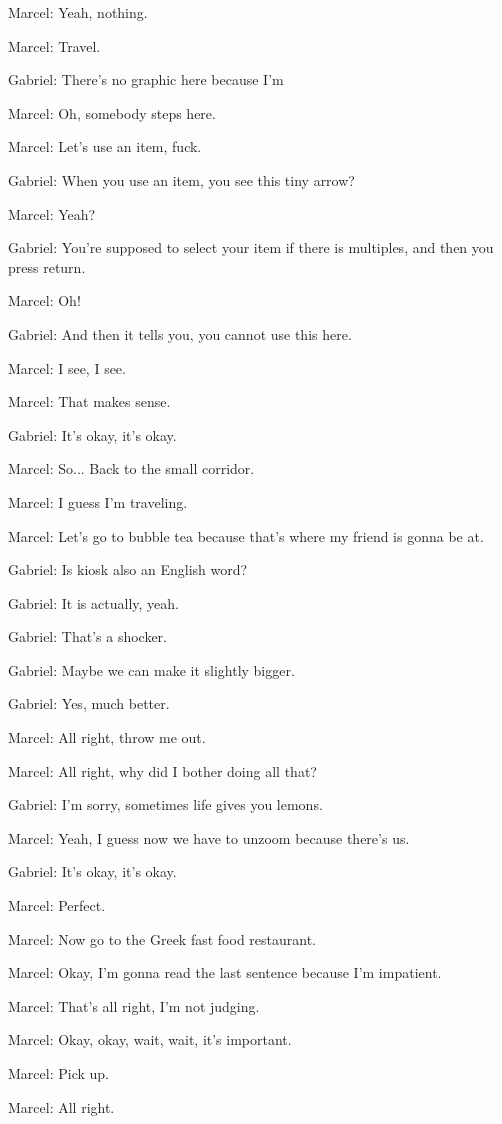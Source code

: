 Marcel: Yeah, nothing.

Marcel: Travel.

Gabriel: There's no graphic here because I'm

Marcel: Oh, somebody steps here.

Marcel: Let's use an item, fuck.

Gabriel: When you use an item, you see this tiny arrow?

Marcel: Yeah?

Gabriel: You're supposed to select your item if there is multiples, and then you press return.

Marcel: Oh!

Gabriel: And then it tells you, you cannot use this here.

Marcel: I see, I see.

Marcel: That makes sense.

Gabriel: It's okay, it's okay.

Marcel: So... Back to the small corridor.

Marcel: I guess I'm traveling.

Marcel: Let's go to bubble tea because that's where my friend is gonna be at.

Gabriel: Is kiosk also an English word?

Gabriel: It is actually, yeah.

Gabriel: That's a shocker.

Gabriel: Maybe we can make it slightly bigger.

Gabriel: Yes, much better.

Marcel: All right, throw me out.

Marcel: All right, why did I bother doing all that?

Gabriel: I'm sorry, sometimes life gives you lemons.

Marcel: Yeah, I guess now we have to unzoom because there's us.

Gabriel: It's okay, it's okay.

Marcel: Perfect.

Marcel: Now go to the Greek fast food restaurant.

Marcel: Okay, I'm gonna read the last sentence because I'm impatient.

Marcel: That's all right, I'm not judging.

Marcel: Okay, okay, wait, wait, it's important.

Marcel: Pick up.

Marcel: All right.

